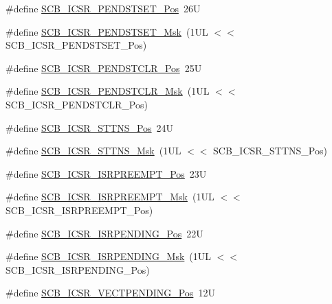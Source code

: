 \begin{DoxyCompactItemize}
\item 
\#define \mbox{\hyperlink{group___c_m_s_i_s___s_c_b_ga9dbb3358c6167c9c3f85661b90fb2794}{S\+C\+B\+\_\+\+I\+C\+S\+R\+\_\+\+P\+E\+N\+D\+S\+T\+S\+E\+T\+\_\+\+Pos}}~26U
\item 
\#define \mbox{\hyperlink{group___c_m_s_i_s___s_c_b_ga7325b61ea0ec323ef2d5c893b112e546}{S\+C\+B\+\_\+\+I\+C\+S\+R\+\_\+\+P\+E\+N\+D\+S\+T\+S\+E\+T\+\_\+\+Msk}}~(1\+U\+L $<$$<$ S\+C\+B\+\_\+\+I\+C\+S\+R\+\_\+\+P\+E\+N\+D\+S\+T\+S\+E\+T\+\_\+\+Pos)
\item 
\#define \mbox{\hyperlink{group___c_m_s_i_s___s_c_b_gadbe25e4b333ece1341beb1a740168fdc}{S\+C\+B\+\_\+\+I\+C\+S\+R\+\_\+\+P\+E\+N\+D\+S\+T\+C\+L\+R\+\_\+\+Pos}}~25U
\item 
\#define \mbox{\hyperlink{group___c_m_s_i_s___s_c_b_gab241827d2a793269d8cd99b9b28c2157}{S\+C\+B\+\_\+\+I\+C\+S\+R\+\_\+\+P\+E\+N\+D\+S\+T\+C\+L\+R\+\_\+\+Msk}}~(1\+U\+L $<$$<$ S\+C\+B\+\_\+\+I\+C\+S\+R\+\_\+\+P\+E\+N\+D\+S\+T\+C\+L\+R\+\_\+\+Pos)
\item 
\#define \mbox{\hyperlink{group___c_m_s_i_s___s_c_b_ga021591700b2d6a6e332d932efaece42b}{S\+C\+B\+\_\+\+I\+C\+S\+R\+\_\+\+S\+T\+T\+N\+S\+\_\+\+Pos}}~24U
\item 
\#define \mbox{\hyperlink{group___c_m_s_i_s___s_c_b_ga70404175bcf7f329758829a9888e48c4}{S\+C\+B\+\_\+\+I\+C\+S\+R\+\_\+\+S\+T\+T\+N\+S\+\_\+\+Msk}}~(1\+U\+L $<$$<$ S\+C\+B\+\_\+\+I\+C\+S\+R\+\_\+\+S\+T\+T\+N\+S\+\_\+\+Pos)
\item 
\#define \mbox{\hyperlink{group___c_m_s_i_s___s_c_b_ga11cb5b1f9ce167b81f31787a77e575df}{S\+C\+B\+\_\+\+I\+C\+S\+R\+\_\+\+I\+S\+R\+P\+R\+E\+E\+M\+P\+T\+\_\+\+Pos}}~23U
\item 
\#define \mbox{\hyperlink{group___c_m_s_i_s___s_c_b_gaa966600396290808d596fe96e92ca2b5}{S\+C\+B\+\_\+\+I\+C\+S\+R\+\_\+\+I\+S\+R\+P\+R\+E\+E\+M\+P\+T\+\_\+\+Msk}}~(1\+U\+L $<$$<$ S\+C\+B\+\_\+\+I\+C\+S\+R\+\_\+\+I\+S\+R\+P\+R\+E\+E\+M\+P\+T\+\_\+\+Pos)
\item 
\#define \mbox{\hyperlink{group___c_m_s_i_s___s_c_b_ga10749d92b9b744094b845c2eb46d4319}{S\+C\+B\+\_\+\+I\+C\+S\+R\+\_\+\+I\+S\+R\+P\+E\+N\+D\+I\+N\+G\+\_\+\+Pos}}~22U
\item 
\#define \mbox{\hyperlink{group___c_m_s_i_s___s_c_b_ga056d74fd538e5d36d3be1f28d399c877}{S\+C\+B\+\_\+\+I\+C\+S\+R\+\_\+\+I\+S\+R\+P\+E\+N\+D\+I\+N\+G\+\_\+\+Msk}}~(1\+U\+L $<$$<$ S\+C\+B\+\_\+\+I\+C\+S\+R\+\_\+\+I\+S\+R\+P\+E\+N\+D\+I\+N\+G\+\_\+\+Pos)
\item 
\#define \mbox{\hyperlink{group___c_m_s_i_s___s_c_b_gada60c92bf88d6fd21a8f49efa4a127b8}{S\+C\+B\+\_\+\+I\+C\+S\+R\+\_\+\+V\+E\+C\+T\+P\+E\+N\+D\+I\+N\+G\+\_\+\+Pos}}~12U
$$
\end{DoxyCompactItemize}
